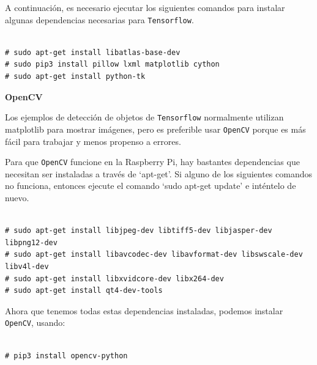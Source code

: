 A continuación, es necesario ejecutar los siguientes comandos para instalar algunas dependencias necesarias para \texttt{Tensorflow}.

\vspace{-1.4cm}

\begin{verbatim}

# sudo apt-get install libatlas-base-dev
# sudo pip3 install pillow lxml matplotlib cython
# sudo apt-get install python-tk

\end{verbatim}

\vspace{-1.4cm}

\textbf{OpenCV}

Los ejemplos de detección de objetos de \texttt{Tensorflow} normalmente utilizan matplotlib para mostrar imágenes, pero es preferible usar \texttt{OpenCV} porque es más fácil para trabajar y menos propenso a errores.

Para que \texttt{OpenCV} funcione en la Raspberry Pi, hay bastantes dependencias que necesitan ser instaladas a través de `apt-get'. Si alguno de los siguientes comandos no funciona, entonces ejecute el comando `sudo apt-get update' e inténtelo de nuevo.


\vspace{-1.4cm}

\begin{verbatim}

# sudo apt-get install libjpeg-dev libtiff5-dev libjasper-dev libpng12-dev
# sudo apt-get install libavcodec-dev libavformat-dev libswscale-dev libv4l-dev
# sudo apt-get install libxvidcore-dev libx264-dev
# sudo apt-get install qt4-dev-tools

\end{verbatim}

\vspace{-1.4cm}

Ahora que tenemos todas estas dependencias instaladas, podemos instalar \texttt{OpenCV}, usando:


\vspace{-1.4cm}

\begin{verbatim}

# pip3 install opencv-python

\end{verbatim}

\vspace{-1.4cm}

